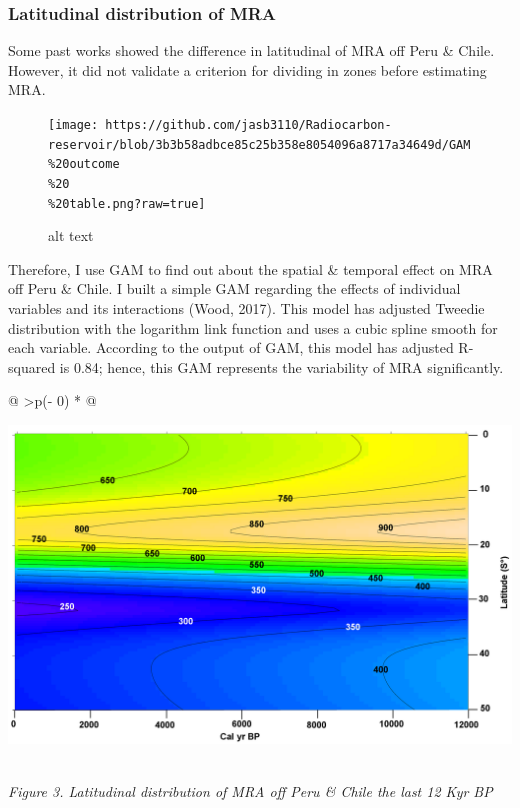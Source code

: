 \documentclass[
]{article}
\begin{document}
\hypertarget{latitudinal-distribution-of-mra}{%
\subsubsection{Latitudinal distribution of
MRA}\label{latitudinal-distribution-of-mra}}

Some past works showed the difference in latitudinal of MRA off Peru \&
Chile. However, it did not validate a criterion for dividing in zones
before estimating MRA.

\begin{figure}
\centering
\texttt{[image: https://github.com/jasb3110/Radiocarbon-reservoir/blob/3b3b58adbce85c25b358e8054096a8717a34649d/GAM\\\%20outcome\\\%20\\\%20table.png?raw=true]}
\caption{alt text}
\end{figure}

Therefore, I use GAM to find out about the spatial \& temporal effect on
MRA off Peru \& Chile. I built a simple GAM regarding the effects of
individual variables and its interactions (Wood, 2017). This model has
adjusted Tweedie distribution with the logarithm link function and uses
a cubic spline smooth for each variable. According to the output of GAM,
this model has adjusted R-squared is 0.84; hence, this GAM represents
the variability of MRA significantly.

\begin{longtable}[]{@{}
  >{\centering\arraybackslash}p{(\columnwidth - 0\tabcolsep) * }@{}}
\toprule
\begin{minipage}[b]{\linewidth}\centering
\href{https://github.com/jasb3110/Radiocarbon-reservoir/blob/5c906b5d15b85dd72416e0abd3e72d53126c9b7b/GAM\%20radiocarbon\%20heat\%20map.png}{\includegraphics{GAM radiocarbon heat map.png}}
\end{minipage} \\
\midrule
\endhead
\emph{Figure 3. Latitudinal distribution of MRA off Peru \& Chile the
last 12 Kyr BP} \\
\bottomrule
\end{longtable}
\end{document}
